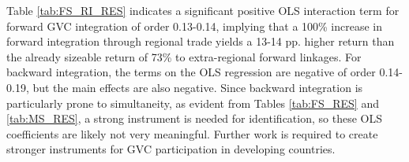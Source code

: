 \documentclass[a4paper]{article}
\begin{document}
Table \ref{tab:FS_RI_RES} indicates a significant positive OLS interaction term for forward GVC integration of order 0.13-0.14, implying that a 100\% increase in forward integration through regional trade yields a 13-14 pp. higher return than the already sizeable return of 73\% to extra-regional forward linkages. For backward integration, the terms on the OLS regression are negative of order 0.14-0.19, but the main effects are also negative. Since backward integration is particularly prone to simultaneity, as evident from Tables \ref{tab:FS_RES} and \ref{tab:MS_RES}, a strong instrument is needed for identification, so these OLS coefficients are likely not very meaningful. Further work is required to create stronger instruments for GVC participation in developing countries. 


\begin{table}[h!]
   \caption{\label{tab:FS_RI_RES} \textsc{EAC5 Regional Integration via RVCs Regressions}}
   \centering
\end{table}
\end{document}
